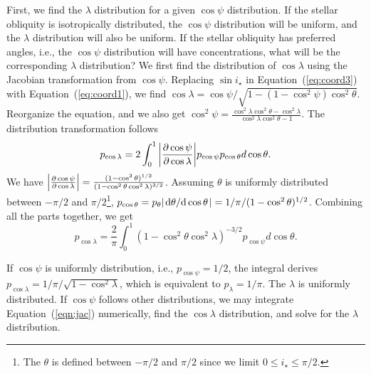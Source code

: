 \documentclass[twocolumn,times]{aastex631}
\begin{document}
First, we find the $\lambda$ distribution for a given $\cos{\psi}$ distribution. If the stellar obliquity is isotropically distributed, the $\cos{\psi}$ distribution will be uniform, and the $\lambda$ distribution will also be uniform. If the stellar obliquity has preferred angles, i.e., the $\cos{\psi}$ distribution will have concentrations, what will be the corresponding $\lambda$ distribution? We first find the distribution of $\cos{\lambda}$ using the Jacobian transformation from $\cos{\psi}$. Replacing $\sin{i_\star}$ in Equation~(\ref{eq:coord3}) with Equation~(\ref{eq:coord1}), we find $\cos{\lambda} = \cos{\psi}/\sqrt{1-(1-\cos^2{\psi})\cos^2{\theta}}$. Reorganize the equation, and we also get $\cos^2{\psi} = \frac{\cos^2{\lambda}\cos^2{\theta}-\cos^2{\lambda}}{\cos^2{\lambda}\cos^2{\theta}-1}$.
The distribution transformation follows
\begin{equation}
    p_{\cos{\lambda}} = 2 \int_{0}^{1} \abs{\pdv{\cos{\psi}}{\cos{\lambda}}} p_{\cos{\psi}} p_{\cos{\theta}} d\cos{\theta}.
\end{equation}
We have $\abs{\pdv{\cos{\psi}}{\cos{\lambda}}} = \frac{(1-\cos^2{\theta})^{1/2}}{(1-\cos^2{\theta}\cos^2{\lambda})^{3/2}}$. Assuming $\theta$ is uniformly distributed between $-\pi/2$ and $\pi/2$\footnote{The $\theta$ is defined between $-\pi/2$ and $\pi/2$ since we limit $0 \leq i_\star \leq \pi/2$.}, $p_{\cos{\theta}} = p_{\theta} \abs{\dv*{\theta}{\cos{\theta}}} = 1/\pi/(1-\cos^2{\theta)^{1/2}}$. Combining all the parts together, we get
\begin{equation}\label{eqn:jac}
    p_{\cos{\lambda}} = \frac{2}{\pi} \int_{0}^{1} (1-\cos^2{\theta}\cos^2{\lambda})^{-3/2} p_{\cos{\psi}} d\cos{\theta}.
\end{equation}

If $\cos{\psi}$ is uniformly distribution, i.e., $p_{\cos{\psi}} = 1/2$, the integral derives $p_{\cos{\lambda}} = 1/\pi/\sqrt{1-\cos^2{\lambda}}$, which is equivalent to $p_\lambda = 1/\pi$. The $\lambda$ is uniformly distributed. If $\cos{\psi}$ follows other distributions, we may integrate Equation~(\ref{eqn:jac}) numerically, find the $\cos{\lambda}$ distribution, and solve for the $\lambda$ distribution.
\end{document}
